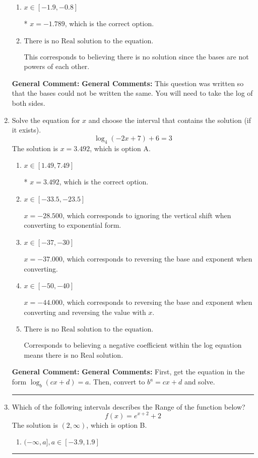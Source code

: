 \documentclass{extbook}[14pt]
\newcommand{\litem}[1]{\item #1

\rule{\textwidth}{0.4pt}}
\begin{document}
\begin{enumerate}
{\begin{enumerate}[label=\Alph*.]
$x = 1.500$, which corresponds to solving the numerators as equal while ignoring the bases are different.
\item \( x \in [-1.9, -0.8] \)

* $x = -1.789$, which is the correct option.
\item \( \text{There is no Real solution to the equation.} \)

This corresponds to believing there is no solution since the bases are not powers of each other.
\end{enumerate}

\textbf{General Comment:} \textbf{General Comments:} This question was written so that the bases could not be written the same. You will need to take the log of both sides.
}
\litem{
Solve the equation for $x$ and choose the interval that contains the solution (if it exists).
\[ \log_{4}{(-2x+7)}+6 = 3 \]The solution is \( x = 3.492 \), which is option A.\begin{enumerate}[label=\Alph*.]
\item \( x \in [1.49, 7.49] \)

* $x = 3.492$, which is the correct option.
\item \( x \in [-33.5, -23.5] \)

$x = -28.500$, which corresponds to ignoring the vertical shift when converting to exponential form.
\item \( x \in [-37, -30] \)

$x = -37.000$, which corresponds to reversing the base and exponent when converting.
\item \( x \in [-50, -40] \)

$x = -44.000$, which corresponds to reversing the base and exponent when converting and reversing the value with $x$.
\item \( \text{There is no Real solution to the equation.} \)

Corresponds to believing a negative coefficient within the log equation means there is no Real solution.
\end{enumerate}

\textbf{General Comment:} \textbf{General Comments:} First, get the equation in the form $\log_b{(cx+d)} = a$. Then, convert to $b^a = cx+d$ and solve.
}
\litem{
Which of the following intervals describes the Range of the function below?
\[ f(x) = e^{x+2}+2 \]The solution is \( (2, \infty) \), which is option B.\begin{enumerate}[label=\Alph*.]
\item \( (-\infty, a], a \in [-3.9, 1.9] \)


\end{enumerate}}
\end{enumerate}
\end{document}
